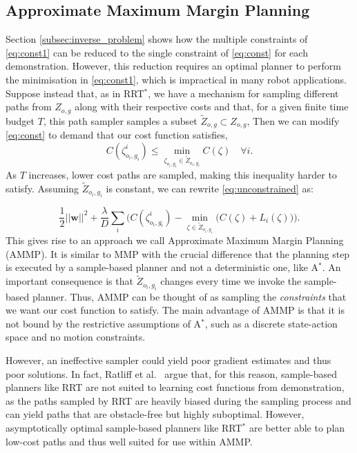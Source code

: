 \documentclass[letterpaper, 10 pt, conference]{ieeeconf}
\begin{document}
	\subsection{Approximate Maximum Margin Planning \label{subsec:ammp}}

Section \ref{subsec:inverse_problem} shows how the multiple constraints of \eqref{eq:const1} can be reduced to the single constraint of \eqref{eq:const} for each demonstration. However, this reduction requires an optimal planner to perform the minimisation in \eqref{eq:const1}, which is impractical in many robot applications. Suppose instead that, as in RRT$^*$, we have a mechanism for sampling different paths from $Z_{o,g}$ along with their respective costs and that, for a given finite time budget $T$, this path sampler samples a subset $\tilde{Z}_{o,g} \subset Z_{o,g}$,  Then we can modify \eqref{eq:const} to demand that our cost function satisfies,
\begin{equation}
	C(\zeta^i_{o_i,g_i}) \leq \min_{\zeta_{o_i,g_i} \in \tilde{Z}_{o_i,g_i}} C(\zeta) \quad \forall i. \label{eq:const_rrt}
\end{equation}
	As $T$ increases, lower cost paths are sampled, making this inequality harder to satisfy. Assuming $\tilde{Z}_{o_i,g_i}$ is constant, we can rewrite \eqref{eq:unconstrained} as:

	\begin{equation} \frac{1}{2}||\mathbf{w}||^2 + \frac{\lambda}{D} \sum_i \big( C(\zeta^i_{o_i,g_i}) - \min_{\zeta \in \tilde{Z}_{o_i,g_i}}\big(C(\zeta) + L_i(\zeta)\big) \big). \label{eq:unconstrained_rrt}
	\end{equation}
This gives rise to an approach we call Approximate Maximum Margin Planning (AMMP). It is similar  to MMP with the crucial difference that the planning step is executed by a sample-based planner and not a deterministic one, like A$^*$. An important consequence is that $\tilde{Z}_{o_i,g_i}$ changes every time we invoke the sample-based planner. Thus, AMMP can be thought of as sampling the \emph{constraints} that we want our cost function to satisfy. The main advantage of AMMP is that it is not bound by the restrictive assumptions of  A$^*$, such as a discrete state-action space and no motion constraints. 

However, an ineffective sampler could yield poor gradient estimates and thus poor solutions. In fact, Ratliff et al.\ \cite{ratliff2009chomp} argue that, for this reason, sample-based planners like RRT are not suited to learning cost functions from demonstration, as the paths sampled by RRT are heavily biased during the sampling process and can yield paths that are obstacle-free but highly suboptimal. However, asymptotically optimal sample-based planners like RRT$^*$ are better able to plan low-cost paths \cite{karaman2011sampling} and thus well suited for use within AMMP.
\end{document}
